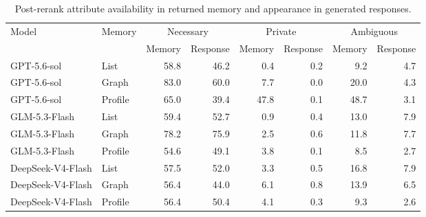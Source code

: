 \begin{table}[t]
\centering
\small
\begin{tabular}{llrrrrrr}
\toprule
Model & Memory & \multicolumn{2}{c}{Necessary} & \multicolumn{2}{c}{Private} & \multicolumn{2}{c}{Ambiguous} \\
 & & Memory & Response & Memory & Response & Memory & Response \\
\midrule
GPT-5.6-sol & List & 58.8 & 46.2 & 0.4 & 0.2 & 9.2 & 4.7 \\
GPT-5.6-sol & Graph & 83.0 & 60.0 & 7.7 & 0.0 & 20.0 & 4.3 \\
GPT-5.6-sol & Profile & 65.0 & 39.4 & 47.8 & 0.1 & 48.7 & 3.1 \\
GLM-5.3-Flash & List & 59.4 & 52.7 & 0.9 & 0.4 & 13.0 & 7.9 \\
GLM-5.3-Flash & Graph & 78.2 & 75.9 & 2.5 & 0.6 & 11.8 & 7.7 \\
GLM-5.3-Flash & Profile & 54.6 & 49.1 & 3.8 & 0.1 & 8.5 & 2.7 \\
DeepSeek-V4-Flash & List & 57.5 & 52.0 & 3.3 & 0.5 & 16.8 & 7.9 \\
DeepSeek-V4-Flash & Graph & 56.4 & 44.0 & 6.1 & 0.8 & 13.9 & 6.5 \\
DeepSeek-V4-Flash & Profile & 56.4 & 50.4 & 4.1 & 0.3 & 9.3 & 2.6 \\
\bottomrule
\end{tabular}
\caption{Post-rerank attribute availability in returned memory and appearance in generated responses.}
\label{tab:memory-response-alignment}
\end{table}
